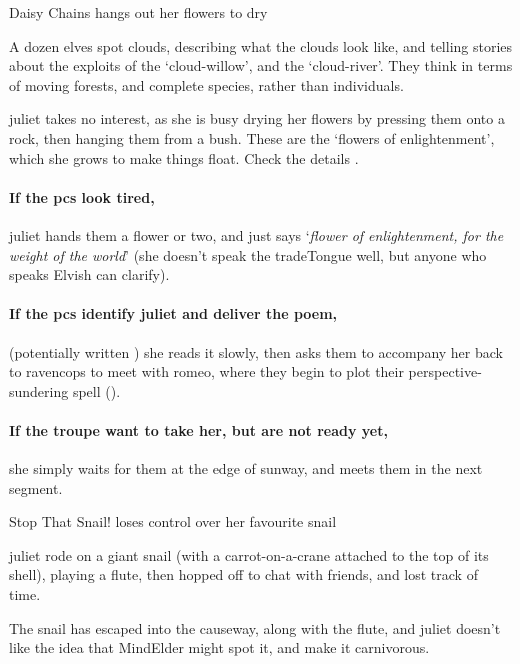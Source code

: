 {Daisy Chains}%
{ hangs out her flowers to dry}%

A dozen elves spot clouds, describing what the clouds look like, and telling stories about the exploits of the `cloud-willow', and the `cloud-river'.
They think in terms of moving forests, and complete species, rather than individuals.

\Gls{juliet} takes no interest, as she is busy drying her flowers by pressing them onto a rock, then hanging them from a bush.
These are the `flowers of enlightenment', which she grows to make things float.
Check the details .

\juliet

\paragraph{If the \glspl{pc} look tired,}
\gls{juliet} hands them a flower or two, and just says `\textit{flower of enlightenment, for the weight of the world}' (she doesn't speak the \gls{tradeTongue} well, but anyone who speaks Elvish can clarify).

\paragraph{If the \glspl{pc} identify \gls{juliet} and deliver the poem,}
(potentially written ) she reads it slowly, then asks them to accompany her back to \gls{ravencops} to meet with \gls{romeo}, where they begin to plot their perspective-sundering spell ().

\paragraph{If the troupe want to take her, but are not ready yet,}
she simply waits for them at the edge of \gls{sunway}, and meets them in the next \gls{segment}.

{Stop That Snail!}%
{ loses control over her favourite snail}%

\Gls{juliet} rode on a giant snail (with a carrot-on-a-crane attached to the top of its shell), playing a flute, then hopped off to chat with friends, and lost track of time.

The snail has escaped into the causeway, along with the flute, and \gls{juliet} doesn't like the idea that \gls{MindElder} might spot it, and make it carnivorous.

